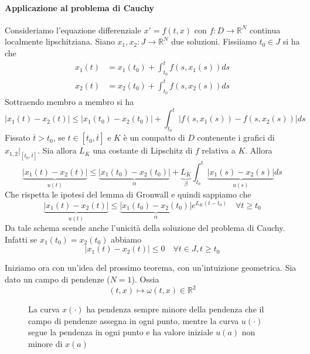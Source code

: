 \paragraph{Applicazione al problema di Cauchy}
Consideriamo l'equazione differenziale \(x' = f(t, x)\) con \(f : D \to
\mathbb{R}^{N}\) continua localmente lipschitziana. Siano \(x_{1},x_{2} : J \to
\mathbb{R}^{N}\) due soluzioni. Fissiiamo \(t_{0} \in J\) si ha che
\begin{align*}
    x_{1}(t) &= x_{1}(t_{0}) + \int_{t_{0}}^{t} f(s, x_{1}(s)) ds \\
    x_{2}(t) &= x_{2}(t_{0}) + \int_{t_{0}}^{t} f(s, x_{2}(s)) ds
\end{align*}
Sottraendo membro a membro si ha
\[
    |x_{1}(t) - x_{2}(t)| \le |x_{1}(t_{0}) - x_{2}(t_{0})| + \int_{t_{0}}^{t}
    |f(s, x_{1}(s)) - f(s, x_{2}(s))| ds
\]
Fissato \(\overline{t} > t_{0}\), se \(t \in [t_{0}, \overline{t}]\) e \(K\) è
un compatto di \(D\) contenente i grafici di \(x_{1, 2}|_{[t_{0}, \overline{t}]}
\). Sia allora \(L_K\) una costante di Lipschitz di \(f\) relativa a \(K\).
Allora
\[
    \underbrace{|x_{1}(t) - x_{2}(t)|}_{u(t)} \le \underbrace{|x_{1}(t_{0}) -
    x_{2}(t_{0})|}_{\alpha} + \underbrace{L_K}_{\beta}
    \int_{t_{0}}^{t} \underbrace{|x_{1}(s) - x_{2}(s)|}_{u(s)} ds
\]
Che rispetta le ipotesi del lemma di Gronwall e quindi sappiamo che
\[
    \underbrace{|x_{1}(t) - x_{2}(t)|}_{u(t)} \le \underbrace{|x_{1}(t_{0}) -
    x_{2}(t_{0})|}_{\alpha} e^{L_K(t-t_{0})}
    \quad \forall t \ge t_{0}
\]
Da tale schema scende anche l'unicità della soluzione del problema di Cauchy.
Infatti se \(x_{1}(t_{0}) = x_{2}(t_{0})\) abbiamo
\[
    |x_{1}(t) - x_{2}(t)| \le 0 \quad \forall t \in J, t \ge t_{0}
\]

Iniziamo ora con un'idea del prossimo teorema, con un'intuizione geometrica. Sia
dato un campo di pendenze (\(N=1\)). Ossia 
\[
    (t, x) \mapsto \omega(t, x) \in \mathbb{R}^2
\]
\begin{figure}[ht]
    \centering
    \caption{La curva \(x(\cdot)\) ha pendenza sempre minore della pendenza che
    il campo di pendenze assegna in ogni punto, mentre la curva \(u(\cdot )\)
segue la pendenza in ogni punto e ha valore iniziale \(u(a)\) non minore di \(x(a)\)  }\label{fig:confronto}
\end{figure}

